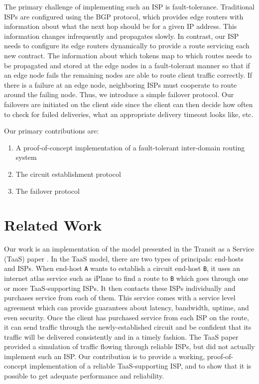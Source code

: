 \documentclass{article}
\begin{document}
The primary challenge of implementing such an ISP is
fault-tolerance. Traditional ISPs are configured using the BGP
protocol, which provides edge routers with information about what the
next hop should be for a given IP address. This information changes
infrequently and propagates slowly. In contrast, our ISP needs to
configure its edge routers dynamically to provide a route servicing
each new contract. The information about which tokens map to which
routes needs to be propagated and stored at the edge nodes in a
fault-tolerant manner so that if an edge node fails the remaining
nodes are able to route client traffic correctly. If there is a
failure at an edge node, neighboring ISPs must cooperate to route
around the failing node. Thus, we introduce a simple failover
protocol. Our failovers are initiated on the client side since the
client can then decide how often to check for failed deliveries, what
an appropriate delivery timeout looks like, etc.

Our primary contributions are:
\begin{enumerate}
\item A proof-of-concept implementation of a fault-tolerant
  inter-domain routing system
\item The circuit establishment protocol
\item The failover protocol
\end{enumerate}

\section{Related Work}
Our work is an implementation of the model presented in the Transit as
a Service (TaaS) paper \cite{taas}. In the TaaS model, there are two
types of principals: end-hosts and ISPs. When end-host \texttt{A}
wants to establish a circuit end-host \texttt{B}, it uses an internet
atlas service such as iPlane \cite{iplane} to find a route to
\texttt{B} which goes through one or more TaaS-supporting ISPs. It
then contacts these ISPs individually and purchases service from each
of them. This service comes with a service level agreement which can
provide guarantees about latency, bandwidth, uptime, and even
security. Once the client has purchased service from each ISP on the
route, it can send traffic through the newly-established circuit and
be confident that its traffic will be delivered consistently and in a
timely fashion. The TaaS paper provided a simulation of traffic
flowing through reliable ISPs, but did not actually implement such an
ISP. Our contribution is to provide a working, proof-of-concept
implementation of a reliable TaaS-supporting ISP, and to show that it
is possible to get adequate performance and reliability.
\end{document}
